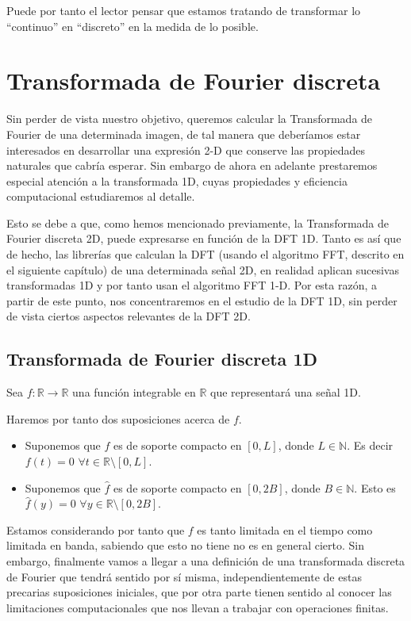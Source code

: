 \vspace{0.2mm}

\noindent Puede por tanto el lector pensar que estamos tratando de transformar lo ``continuo'' en ``discreto'' en la medida de lo posible.

\section{Transformada de Fourier discreta}

Sin perder de vista nuestro objetivo, queremos calcular la Transformada de Fourier de una determinada imagen, de tal manera que deberíamos estar interesados en desarrollar una expresión 2-D que conserve las propiedades naturales que cabría esperar. Sin embargo de ahora en adelante prestaremos especial atención a la transformada 1D, cuyas propiedades y eficiencia computacional estudiaremos al detalle.


Esto se debe a que, como hemos mencionado previamente, la Transformada de Fourier discreta 2D, puede expresarse en función de la  DFT 1D. Tanto es así que de hecho, las librerías que calculan la DFT (usando el algoritmo FFT, descrito en el siguiente capítulo) de una determinada señal 2D, en realidad aplican sucesivas transformadas 1D y por tanto usan el algoritmo FFT 1-D. Por esta razón, a partir de este punto, nos concentraremos en el estudio de la DFT 1D, sin perder de vista ciertos aspectos relevantes de la DFT 2D.

\subsection{Transformada de Fourier discreta 1D}

Sea $f : \mathbb{R} \rightarrow  \mathbb{R}$  una función integrable en $\mathbb{R}$ que representará una señal 1D.

\noindent Haremos por tanto dos suposiciones acerca de $f$.
\begin{itemize}
    \item Suponemos que \( f \) es de soporte compacto en \([0, L]\), donde \( L \in \mathbb{N} \). Es decir $f(t)=0 \, \, \forall t \in \mathbb{R} \setminus [0, L]$.
    \item Suponemos que \( \widehat{f} \) es de soporte compacto en  \([0, 2B]\), donde \( B \in \mathbb{N} \). Esto es $\widehat{f}(y)=0 \, \, \forall y \in \mathbb{R} \setminus [0, 2B]$.
\end{itemize}

\noindent Estamos considerando  por tanto que $f$ es tanto limitada en el tiempo como limitada en banda, sabiendo que esto no tiene no es en general cierto. Sin embargo, finalmente vamos a llegar a una definición de una transformada discreta de Fourier que tendrá sentido por sí misma, independientemente de estas precarias suposiciones iniciales, que por otra parte tienen sentido al conocer las limitaciones computacionales que nos llevan a trabajar con operaciones finitas.  

